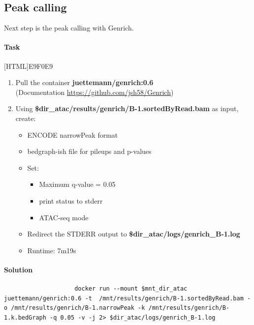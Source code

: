 \documentclass[12pt]{article}
\begin{document}
		\subsection{Peak calling}
			Next step is the peak calling with Genrich. 
			
			\paragraph{Task}
			
			[HTML]{E9F0E9}{\parbox{\linewidth}{%
					\begin{enumerate}
						\item  Pull the container  \textbf{juettemann/genrich:0.6} \\
						(Documentation  \url{https://github.com/jsh58/Genrich})
						\item Using\textbf{ \$dir\_atac/results/genrich/B-1.sortedByRead.bam} as input, create:
						\begin{itemize}
							\item ENCODE narrowPeak format
							\item bedgraph-ish file for pileups and p-values
							\item Set:
							\begin{itemize}
								\item Maximum q-value = 0.05
								\item print status to stderr
								\item ATAC-seq mode 
							\end{itemize}
							\item Redirect the STDERR output to \textbf{\$dir\_atac/logs/genrich\_B-1.log}
							\item Runtime: 7m19s
						\end{itemize}
					\end{enumerate}
			}}
			
			
			\paragraph{Solution}
				
			\begin{minipage}{\linewidth}
				\begin{lstlisting}
					docker run --mount $mnt_dir_atac juettemann/genrich:0.6 -t  /mnt/results/genrich/B-1.sortedByRead.bam -o /mnt/results/genrich/B-1.narrowPeak -k /mnt/results/genrich/B-1.k.bedGraph -q 0.05 -v -j 2> $dir_atac/logs/genrich_B-1.log
				\end{lstlisting}
			\end{minipage}
	
\end{document}
